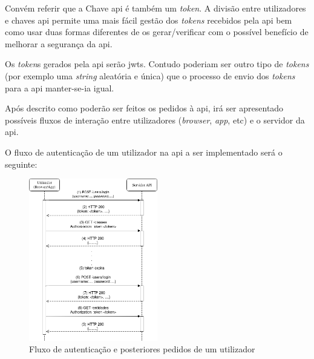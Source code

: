 Convém referir que a Chave \acrshort{api} é também um \textit{token}. A divisão entre utilizadores e chaves \acrshort{api} permite uma mais fácil gestão dos \textit{tokens} recebidos pela \acrshort{api} bem como usar duas formas diferentes de os gerar/verificar com o possível benefício de melhorar a segurança da \acrshort{api}.

Os \textit{token}s gerados pela \acrshort{api} serão \acrshort{jwt}s. Contudo poderiam ser outro tipo de \textit{tokens} (por exemplo uma \textit{string} aleatória e única) que o processo de envio dos \textit{tokens} para a \acrshort{api} manter-se-ia igual.

Após descrito como poderão ser feitos os pedidos à \acrshort{api}, irá ser apresentado possíveis fluxos de interação entre utilizadores (\textit{browser}, \textit{app}, etc) e o servidor da \acrshort{api}.

O fluxo de autenticação de um utilizador na \acrshort{api} a ser implementado será o seguinte:
\begin{figure}[H]
    \begin{center}
        \includegraphics[width=0.5\textwidth]{img/userAuth.png}
    \end{center}
    \caption{Fluxo de autenticação e posteriores pedidos de um utilizador}\label{fig:userAuth}
\end{figure}

